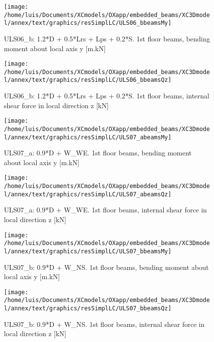 \clearpage
\begin{figure}
\begin{center}
\texttt{[image: /home/luis/Documents/XCmodels/OXapp/embedded\_beams/XC3Dmodel/annex/text/graphics/resSimplLC/ULS06\_bbeamsMy]}
\caption{ULS06_b: 1.2*D + 0.5*Lrs + Lps + 0.2*S. 1st floor beams, bending moment about local axis y [m.kN]}
\end{center}
\end{figure}
\begin{figure}
\begin{center}
\texttt{[image: /home/luis/Documents/XCmodels/OXapp/embedded\_beams/XC3Dmodel/annex/text/graphics/resSimplLC/ULS06\_bbeamsQz]}
\caption{ULS06_b: 1.2*D + 0.5*Lrs + Lps + 0.2*S. 1st floor beams, internal shear force in local direction z [kN]}
\end{center}
\end{figure}
\clearpage
\begin{figure}
\begin{center}
\texttt{[image: /home/luis/Documents/XCmodels/OXapp/embedded\_beams/XC3Dmodel/annex/text/graphics/resSimplLC/ULS07\_abeamsMy]}
\caption{ULS07_a: 0.9*D + W_WE. 1st floor beams, bending moment about local axis y [m.kN]}
\end{center}
\end{figure}
\begin{figure}
\begin{center}
\texttt{[image: /home/luis/Documents/XCmodels/OXapp/embedded\_beams/XC3Dmodel/annex/text/graphics/resSimplLC/ULS07\_abeamsQz]}
\caption{ULS07_a: 0.9*D + W_WE. 1st floor beams, internal shear force in local direction z [kN]}
\end{center}
\end{figure}
\clearpage
\begin{figure}
\begin{center}
\texttt{[image: /home/luis/Documents/XCmodels/OXapp/embedded\_beams/XC3Dmodel/annex/text/graphics/resSimplLC/ULS07\_bbeamsMy]}
\caption{ULS07_b: 0.9*D + W_NS. 1st floor beams, bending moment about local axis y [m.kN]}
\end{center}
\end{figure}
\begin{figure}
\begin{center}
\texttt{[image: /home/luis/Documents/XCmodels/OXapp/embedded\_beams/XC3Dmodel/annex/text/graphics/resSimplLC/ULS07\_bbeamsQz]}
\caption{ULS07_b: 0.9*D + W_NS. 1st floor beams, internal shear force in local direction z [kN]}
\end{center}
\end{figure}
\clearpage

